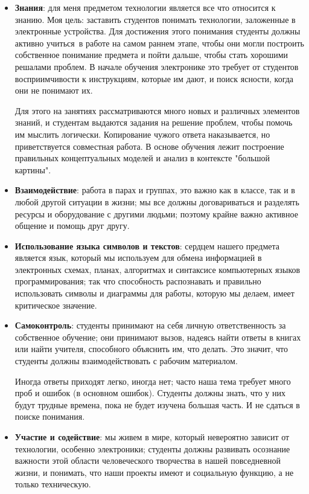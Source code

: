 \begin{itemize}

\item\textbf{Знания}: для меня предметом технологии является все что относится к
знанию. Моя цель: заставить студентов понимать технологии, заложенные в
электронные устройства. Для достижения этого понимания студенты должны активно
учиться\
в работе на самом раннем этапе, чтобы они могли построить собственное понимание
предмета и пойти дальше, чтобы стать хорошими решалами проблем. В начале
обучения электронике это требует от студентов восприимчивости к инструкциям,
которые им дают, и поиск ясности, когда они не понимают их.

Для этого на занятиях рассматриваются много новых и различных элементов знаний,
и студентам выдаются задания на решение проблем, чтобы помочь им мыслить
логически. Копирование чужого ответа наказывается, но приветствуется совместная
работа. В основе обучения лежит построение правильных концептуальных моделей и
анализ в контексте "большой картины".

\item\textbf{Взаимодействие}: работа в парах и группах, это важно как в классе,
так и в любой другой ситуации в жизни; мы все должны договариваться и разделять
ресурсы и оборудование с другими людьми; поэтому крайне важно активное общение и
помощь друг другу.

\item\textbf{Использование языка символов и текстов}: сердцем нашего предмета
является язык, который мы используем для обмена информацией в электронных
схемах, планах, алгоритмах и синтаксисе компьютерных языков программирования;
так что способность распознавать и правильно использовать символы и диаграммы для
работы, которую мы делаем, имеет критическое значение.

\item\textbf{Самоконтроль}: студенты принимают на себя личную ответственность за
собственное обучение; они принимают вызов, надеясь найти ответы в книгах или
найти учителя, способного объяснить им, что делать. Это значит, что студенты
должны взаимодействовать с рабочим материалом. 

Иногда ответы приходят легко, иногда нет; часто наша тема требует много проб и
ошибок (в основном ошибок). Студенты должны знать, что у них будут трудные
времена, пока не будет изучена большая часть. И не сдаться в поиске понимания.

\item\textbf{Участие и содействие}: мы живем в мире, который невероятно зависит
от технологии, особенно электроники; студенты должны развивать осознание
важности этой области человеческого творчества в нашей повседневной жизни, и
понимать, что наши проекты имеют и социальную функцию, а не только техническую.

\end{itemize}

